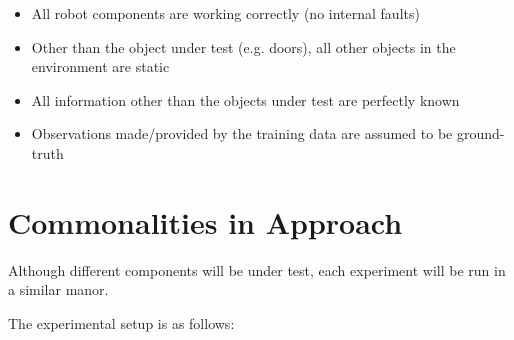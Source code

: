 \begin{itemize}

  \item All robot components are working correctly (no internal faults)

  \item Other than the object under test (e.g. doors), all other objects in the
        environment are static

  \item All information other than the objects under test are perfectly known

  \item Observations made/provided by the training data are assumed to be ground-truth

\end{itemize}


\section{ Commonalities in Approach }
Although different components will be under test, each experiment will be run
in a similar manor.

The experimental setup is as follows:

